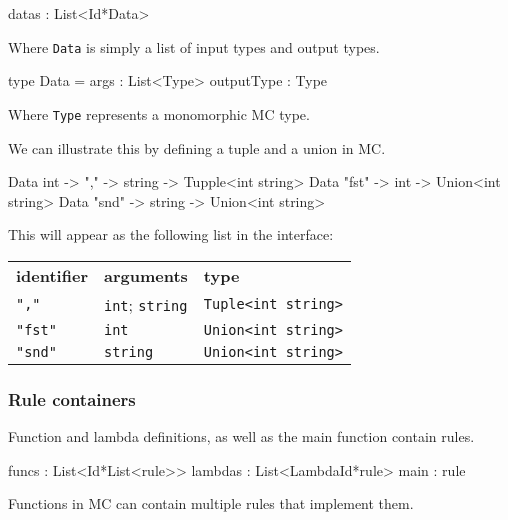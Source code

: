 \begin{FS}
datas : List<Id*Data>
\end{FS}

Where \verb|Data| is simply a list of input types and output types.

\begin{FS}
type Data = {
  args       : List<Type>
  outputType : Type
}
\end{FS}

Where \verb|Type| represents a monomorphic MC type.


We can illustrate this by defining a tuple and a union in MC.

\begin{MC}
Data int -> "," -> string -> Tupple<int string>
Data "fst" -> int    -> Union<int string>
Data "snd" -> string -> Union<int string>
\end{MC}

This will appear as the following list in the interface:

{\footnotesize
\begin{tabular}{lll}
    \textbf{\normalsize identifier} & \textbf{\normalsize arguments} & \textbf{\normalsize type}\\
    \verb:",":   & \verb:int:; \verb:string: & \verb:Tuple<int string>: \\
    \verb:"fst": & \verb:int:                & \verb:Union<int string>: \\
    \verb:"snd": & \verb:string:             & \verb:Union<int string>: \\
\end{tabular}
}


\subsubsection{Rule containers}

Function and lambda definitions, as well as the main function contain rules.

\begin{FS}
  funcs   : List<Id*List<rule>>
  lambdas : List<LambdaId*rule>
  main    : rule
\end{FS}

Functions in MC can contain multiple rules that implement them.

